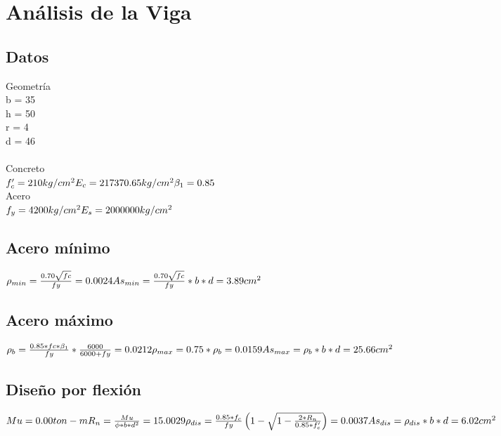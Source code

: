 \documentclass{article}%
\begin{document}
%
\normalsize%
\section{Análisis de la Viga}%
\label{sec:AnlisisdelaViga}%
\subsection{Datos}%
\label{subsec:Datos}%
Geometría \\b = 35 \\  h = 50 \\ r = 4 \\  d = 46 \\ \\Concreto \\$ f'_{c} = 210kg/cm^{2} \\E_{c} = 217370.65kg/cm^{2} \\\beta_{1} = 0.85\\ $\\Acero \\ $ f_{y} = 4200kg/cm^{2} \\E_{s} = 2000000kg/cm^{2} $ 

%
\subsection{Acero mínimo}%
\label{subsec:Aceromnimo}%
$ \rho_{min} = \frac{0.70 \sqrt{fc}}{fy} = 0.0024\\As_{min} = \frac{0.70 \sqrt{fc}}{fy}*b*d = 3.89cm^{2} $ \\

%
\subsection{Acero máximo}%
\label{subsec:Aceromximo}%
$ \rho_{b} = \frac{0.85 * fc * \beta_{1}} {fy} * \frac{6000}{6000+fy} = 0.0212\\\rho_{max} = 0.75*\rho_{b} = 0.0159\\As_{max} = \rho_{b}*b*d = 25.66cm^{2} $ \\

%
\subsection{Diseño por flexión}%
\label{subsec:Diseoporflexin}%
$ Mu = 0.00ton-m \\ R_{n} = \frac{Mu}{\phi*b*d^{2}} = 15.0029\\ \rho_{dis} = \frac {0.85*f_{c}}{fy} \left( 1 - \sqrt{1- \frac{2*R_{n}}{0.85*f'_{c}}}  \right) = 0.0037  \\ As_{dis} = \rho_{dis}*b*d = 6.02cm^{2} \\ $
\end{document}
